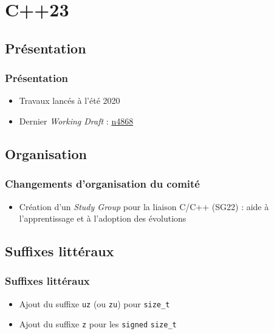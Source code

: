 \documentclass[C++.tex]{subfiles}
\begin{document}
\section{C++23}
\subsection*{Présentation}
\begin{frame}
	\frametitle{Présentation}
	\begin{itemize}
		\item Travaux lancés à l'été 2020
		\item Dernier \textit{Working Draft} : \href{https://github.com/cplusplus/draft/releases/download/n4868/n4868.pdf}{n4868}
	\end{itemize}
\end{frame}

\subsection*{Organisation}
\begin{frame}
	\frametitle{Changements d'organisation du comité}
	\begin{itemize}
		\item Création d'un \textit{Study Group} pour la liaison C/C++ (SG22) : aide à l'apprentissage et à l'adoption des évolutions
	\end{itemize}
\end{frame}

\subsection*{Suffixes littéraux}
\begin{frame}[fragile]
	\frametitle{Suffixes littéraux}
	\begin{itemize}
		\item Ajout du suffixe \lstinline|uz| (ou \lstinline|zu|) pour \lstinline|size_t|
		\item Ajout du suffixe \lstinline|z| pour les \og \lstinline|signed|\fg{} \lstinline|size_t|

	\end{itemize}
\end{frame}
\end{document}
